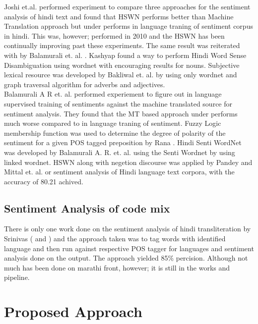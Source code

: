\documentclass[conference]{IEEEtran}
\begin{document}
Joshi et.al. \cite{joshi_fall-back_2010} performed experiment to compare three
approaches for the sentiment analysis of hindi text and found that HSWN
performs better than Machine Translation approach but under performs in
language traning of sentiment corpus in hindi. This was, however; performed in
2010 and the HSWN has been continually improving past these experiments. The
same result was reiterated with by Balamurali et. al.
\cite{hutchison_lost_2013}. Kashyap \cite{kashyap_hindi_????} found a way to
perform Hindi Word Sense Disambiguation using wordnet with encouraging results
for nouns. Subjective lexical resource was developed by Bakliwal et. al.
\cite{bakliwal_hindi_2012} by using only wordnet and graph traversal algorithm
for adverbs and adjectives.\\

Balamurali A R et. al. \cite{balamurali_a_r_cross-lingual_????} performed
experiement to figure out in language supervised training of sentiments against
the machine translated source for sentiment analysis. They found that the MT
based approach under performs much worse compared to in language traning of
sentiment. Fuzzy Logic membership function was used to determine the degree of
polarity of the sentiment for a given POS tagged preposition by Rana
\cite{shweta_rana_sentiment_2014}. Hindi Senti WordNet was developed by
Balamurali A. R. et. al. \cite{balamurali_a_r_cross-lingual_????} using the Senti Wordnet by using linked wordnet. HSWN along with negetion discourse was applied by Pandey
\cite{pandey_framework_2015} and Mittal et. al. \cite{mittal_sentiment_2013} or
sentiment analysis of Hindi language text corpora, with the accuracy of 80.21
achived. \\

\subsection{Sentiment Analysis of code mix}
There is only one work done on the sentiment analysis of hindi transliteration
by Srinivas (\cite{sharma_text_2015} and \cite{shashank_sharma_sentiment_????}
) and the approach taken was to tag words with identified language and then run
against respective POS tagger for languages and sentiment analysis done on the
output. The approach yielded 85\% percision. Although not much has been done on
marathi front, however; it is still in the works and pipeline.\\


\section{Proposed Approach}
\end{document}
